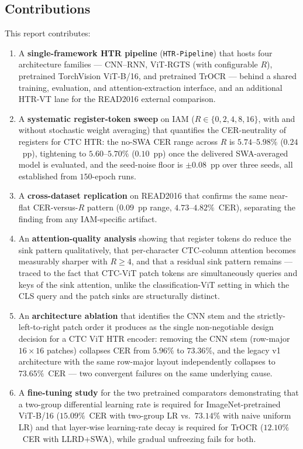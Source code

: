 \subsection{Contributions}
\label{sec:contributions}

This report contributes:

\begin{enumerate}
    \item A \textbf{single-framework HTR pipeline} (\texttt{HTR-Pipeline}) that hosts four architecture families --- CNN--RNN, ViT-RGTS (with configurable $R$), pretrained TorchVision ViT-B/16, and pretrained TrOCR --- behind a shared training, evaluation, and attention-extraction interface, and an additional HTR-VT lane for the READ2016 external comparison.
    \item A \textbf{systematic register-token sweep} on IAM ($R \in \{0, 2, 4, 8, 16\}$, with and without stochastic weight averaging) that quantifies the CER-neutrality of registers for CTC HTR: the no-SWA CER range across $R$ is $5.74$--$5.98\%$ ($0.24$~pp), tightening to $5.60$--$5.70\%$ ($0.10$~pp) once the delivered SWA-averaged model is evaluated, and the seed-noise floor is $\pm 0.08$~pp over three seeds, all established from $150$-epoch runs.
    \item A \textbf{cross-dataset replication} on READ2016 that confirms the same near-flat CER-versus-$R$ pattern ($0.09$~pp range, $4.73$--$4.82\%$~CER), separating the finding from any IAM-specific artifact.
    \item An \textbf{attention-quality analysis} showing that register tokens do reduce the sink pattern qualitatively, that per-character CTC-column attention becomes measurably sharper with $R \geq 4$, and that a residual sink pattern remains --- traced to the fact that CTC-ViT patch tokens are simultaneously queries and keys of the sink attention, unlike the classification-ViT setting in which the CLS query and the patch sinks are structurally distinct.
    \item An \textbf{architecture ablation} that identifies the CNN stem and the strictly-left-to-right patch order it produces as the single non-negotiable design decision for a CTC ViT HTR encoder: removing the CNN stem (row-major $16{\times}16$ patches) collapses CER from $5.96\%$ to $73.36\%$, and the legacy v1 architecture with the same row-major layout independently collapses to $73.65\%$~CER --- two convergent failures on the same underlying cause.
    \item A \textbf{fine-tuning study} for the two pretrained comparators demonstrating that a two-group differential learning rate is required for ImageNet-pretrained ViT-B/16 ($15.09\%$~CER with two-group LR vs.\ $73.14\%$ with naive uniform LR) and that layer-wise learning-rate decay is required for TrOCR ($12.10\%$~CER with LLRD+SWA), while gradual unfreezing fails for both.

\end{enumerate}
